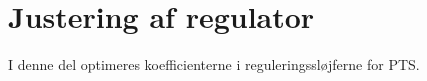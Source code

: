\part{Justering af regulator}
I denne del optimeres koefficienterne i reguleringssløjferne for PTS.

